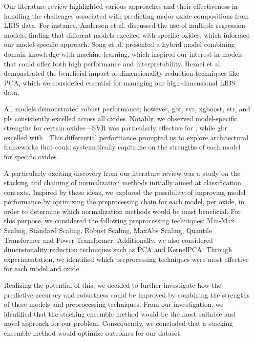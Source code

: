 Our literature review highlighted various approaches and their effectiveness in handling the challenges associated with predicting major oxide compositions from LIBS data. 
For instance, Anderson et al. discussed the use of multiple regression models, finding that different models excelled with specific oxides, which informed our model-specific approach. 
Song et al. presented a hybrid model combining domain knowledge with machine learning, which inspired our interest in models that could offer both high performance and interpretability. Rezaei et al. demonstrated the beneficial impact of dimensionality reduction techniques like PCA, which we considered essential for managing our high-dimensional LIBS data.

All models demonstrated robust performance; however, \gls{gbr}, \gls{svr}, \gls{xgboost}, \gls{etr}, and \gls{pls} consistently excelled across all oxides. 
Notably, we observed model-specific strengths for certain oxides—SVR was particularly effective for , while \gls{gbr} excelled with . 
This differential performance prompted us to explore architectural frameworks that could systematically capitalize on the strengths of each model for specific oxides.

A particularly exciting discovery from our literature review was a study on the stacking and chaining of normalization methods initially aimed at classification contexts. 
Inspired by these ideas, we explored the possibility of improving model performance by optimizing the preprocessing chain for each model, per oxide, in order to determine which normalization methods would be most beneficial.
For this purpose, we considered the following preprocessing techniques: Min-Max Scaling, Standard Scaling, Robust Scaling, MaxAbs Scaling, Quantile Transformer and Power Transformer. 
Additionally, we also considered dimensionality reduction techniques such as PCA and KernelPCA.
Through experimentation, we identified which preprocessing techniques were most effective for each model and oxide. 

Realizing the potential of this, we decided to further investigate how the predictive accuracy and robustness could be improved by combining the strengths of these models and preprocessing techniques.
From our investigation, we identified that the stacking ensemble method would be the most suitable and novel approach for our problem.
Consequently, we concluded that a stacking ensemble method would optimize outcomes for our dataset. 

